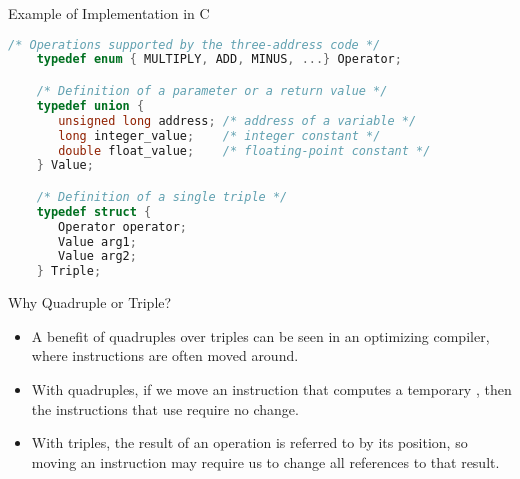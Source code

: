 \begin{bibunit}[apalike]
\begin{frame}[fragile]{Example of Implementation in C}
	\begin{lstlisting}[language=C,basicstyle=\scriptsize]
	/* Operations supported by the three-address code */
	typedef enum { MULTIPLY, ADD, MINUS, ...} Operator;

	/* Definition of a parameter or a return value */
	typedef union { 
	   unsigned long address; /* address of a variable */
	   long integer_value;    /* integer constant */
	   double float_value;    /* floating-point constant */
	} Value;

	/* Definition of a single triple */
	typedef struct {
	   Operator operator;
	   Value arg1;
	   Value arg2;
	} Triple;
	\end{lstlisting}
\end{frame}


\begin{frame}{Why Quadruple or Triple?}
	\begin{itemize}
	\item A benefit of quadruples over triples can be seen in an optimizing compiler, where instructions are often moved around.
	\vfill
	\item With quadruples, if we move an instruction that computes a temporary , then the instructions that use  require no change.
	\vfill
	\item With triples, the result of an operation is referred to by its position, so moving an instruction may require us to change all references to that result.
	\end{itemize}
	\vfill
\end{frame}


\end{bibunit}
